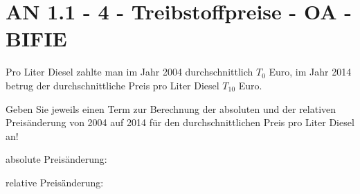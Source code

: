 \section{AN 1.1 - 4 - Treibstoffpreise - OA - BIFIE}

\begin{beispiel}[AN 1.1]{1} %
Pro Liter Diesel zahlte man im Jahr 2004 durchschnittlich $T_0$ Euro, im Jahr 2014 betrug der durchschnittliche Preis pro Liter Diesel $T_{10}$ Euro. 

Geben Sie jeweils einen Term zur Berechnung der absoluten und der relativen Preisänderung von 2004 auf 2014 für den durchschnittlichen Preis pro Liter Diesel an!\leer

absolute Preisänderung:\,
\leer

relative Preisänderung:\,
\end{beispiel}